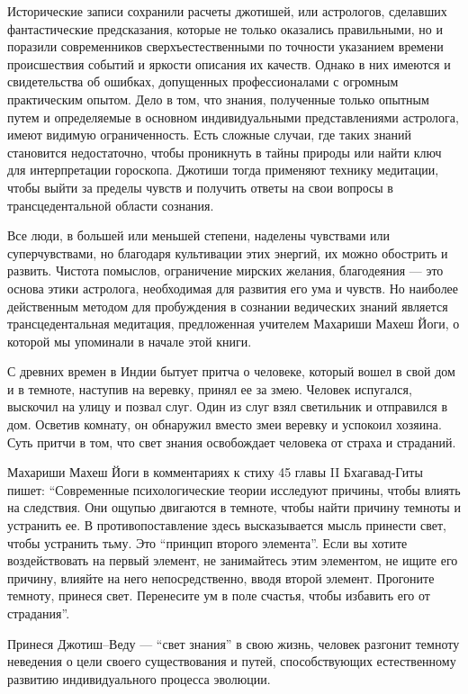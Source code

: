 
Исторические записи сохранили расчеты джотишей, или астрологов, сделавших фантастические предсказания, которые не только оказались правильными, но и поразили современников сверхъестественными по точности указанием времени происшествия событий и яркости описания их качеств. Однако в них имеются и свидетельства об ошибках, допущенных профессионалами с огромным практическим опытом. Дело в том, что знания, полученные только опытным путем и определяемые в основном индивидуальными представлениями астролога, имеют видимую ограниченность. Есть сложные случаи, где таких знаний становится недостаточно, чтобы проникнуть в тайны природы или найти ключ для интерпретации гороскопа. Джотиши тогда применяют технику медитации, чтобы выйти за пределы чувств и получить ответы на свои вопросы в трансцедентальной области сознания.

Все люди, в большей или меньшей степени, наделены чувствами или суперчувствами, но благодаря культивации этих энергий, их можно обострить и развить. Чистота помыслов, ограничение мирских желания, благодеяния --- это основа этики астролога, необходимая для развития его ума и чувств. Но наиболее действенным методом для пробуждения в сознании ведических знаний является трансцедентальная медитация, предложенная учителем Махариши Махеш Йоги, о которой мы упоминали в начале этой книги.

С древних времен в Индии бытует притча о человеке, который вошел в свой дом и в темноте, наступив на веревку, принял ее за змею. Человек испугался, выскочил на улицу и позвал слуг. Один из слуг взял светильник и отправился в дом. Осветив комнату, он обнаружил вместо змеи веревку и успокоил хозяина. Суть притчи в том, что свет знания освобождает человека от страха и страданий.

Махариши Махеш Йоги в комментариях к стиху 45 главы II Бхагавад-Гиты пишет: ``Современные психологические теории исследуют причины, чтобы влиять на следствия. Они ощупью двигаются в темноте, чтобы найти причину темноты и устранить ее. В противопоставление здесь высказывается мысль принести свет, чтобы устранить тьму. Это ``принцип второго элемента''. Если вы хотите воздействовать на первый элемент, не занимайтесь этим элементом, не ищите его причину, влияйте на него непосредственно, вводя второй элемент. Прогоните темноту, принеся свет. Перенесите ум в поле счастья, чтобы избавить его от страдания''.

Принеся Джотиш--Веду --- ``свет знания'' в свою жизнь, человек разгонит темноту неведения о цели своего существования и путей, способствующих естественному развитию индивидуального процесса эволюции.

